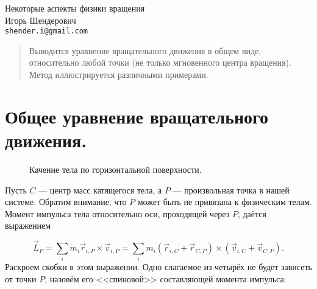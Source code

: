 \documentclass[a4paper,12pt]{article}
\begin{document}

\begin{center}
  \LARGE{Некоторые аспекты физики вращения}\\[0.2cm]
  \large{Игорь Шендерович}\\[0.2cm]
  \normalsize{\texttt{shender.i@gmail.com}}
\end{center}

\begin{abstract}
  Выводится уравнение вращательного движения в общем виде,
  относительно любой точки (не только мгновенного центра
  вращения). Метод иллюстрируется различными примерами. 
\end{abstract}

\section{Общее уравнение вращательного движения. }
\label{sec:general_eom}

\begin{figure}[h]
  \centering
  \caption{Качение тела по горизонтальной поверхности.}
  \label{fig:rolling_general}
\end{figure}

Пусть $C$ --- центр масс катящегося тела, а $P$ --- произвольная точка
в нашей системе. Обратим внимание, что $P$ может быть не привязана к
физическим телам. Момент импульса тела относительно оси, проходящей
через $P$, даётся выражением

\begin{equation}
  \label{eq:momentum_p_general_1}
  \vec{L}_{P} = \sum_i m_i \vec{r}_{i,P} \times \vec{v}_{i,P} = \sum_i
  m_i \left( \vec{r}_{i,C} + \vec{r}_{C,P} \right) \times \left(
    \vec{v}_{i,C} + \vec{v}_{C,P} \right). 
\end{equation}
Раскроем скобки в этом выражении. Одно слагаемое из четырёх не будет
зависеть от точки $P$, назовём его <<спиновой>> составляющей момента
импульса:
\end{document}
